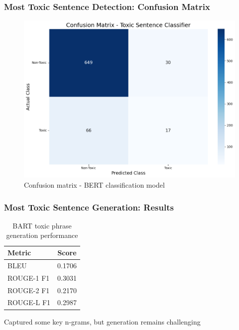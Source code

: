 \documentclass[aspectratio=169,xcolor=dvipsnames]{beamer}
\begin{document}
\begin{frame}
\frametitle{Most Toxic Sentence Detection: Confusion Matrix}

\begin{figure}
\centering
\includegraphics[width=0.6\linewidth]{figures/bert_toxic_confusion_matrix.png}
\caption{Confusion matrix - BERT classification model}
\end{figure}

\end{frame}

\begin{frame}
\frametitle{Most Toxic Sentence Generation: Results}

\begin{table}
\centering
\begin{tabular}{lc}
\toprule
\textbf{Metric} & \textbf{Score} \\
\midrule
BLEU & 0.1706 \\
ROUGE-1 F1 & 0.3031 \\
ROUGE-2 F1 & 0.2170 \\
ROUGE-L F1 & 0.2987 \\
\bottomrule
\end{tabular}
\caption{BART toxic phrase generation performance}
\end{table}

\vspace{0.2cm}
\begin{center}
\colorbox{green!10}{\parbox{0.8\linewidth}{\centering Captured some key n-grams, but generation remains challenging}}
\end{center}

\end{frame}
\end{document}
